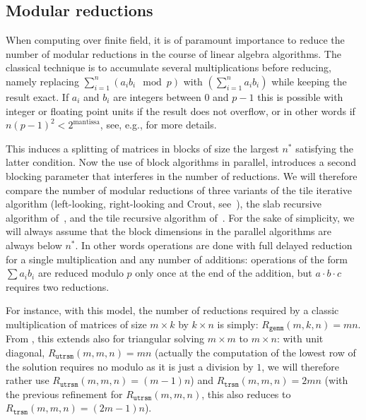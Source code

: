 \documentclass{article}
\newcommand{\gemm}{\texttt{gemm}\xspace}
\newcommand{\trsm}{\texttt{trsm}\xspace}
\newcommand{\utrsm}{\texttt{utrsm}\xspace}
\begin{document}
 
 
 
 
 
 
 

 

 
 
 
 
 

 

 
 
 

 
 

\subsection{Modular reductions}
\label{sec:modcount}
When computing over finite field, it is of paramount importance to
reduce the number of modular reductions in the course of linear algebra
algorithms. The classical technique is to accumulate several
multiplications before reducing, namely replacing 
$\sum_{i=1}^n (a_ib_i \mod p)$ with $\left(\sum_{i=1}^n a_ib_i\right)$ while keeping
the result exact. If $a_i$ and $b_i$ are integers between $0$ and
$p-1$ this is possible with integer or floating point units if the
result does not overflow, or in other words if
$n(p-1)^2<2^\text{mantissa}$, see, e.g., \cite{DGP08} for more
details. 

This induces a splitting of matrices in blocks of size the largest $n^*$ satisfying
the latter condition. Now the use of block algorithms in parallel, introduces a
second blocking parameter that interferes in the number of reductions.
We will therefore compare the number of modular reductions of three variants of
the tile iterative algorithm (left-looking, right-looking and Crout, see~\cite{DDSV98}), the slab
recursive algorithm of~\cite{DGP08}, and the tile recursive algorithm of~\cite{DPS13}.
For the sake of simplicity, we will always assume that the block dimensions in the
parallel algorithms are always below $n^*$. In other words operations are done with full
delayed reduction for a single multiplication and any number of
additions: operations of the form $\sum a_i b_i$ are reduced modulo
$p$ only once at the end of the addition, but $a \cdot b \cdot c$ requires two
reductions.
 
 
 
 
 
 
 
 
 
 
 
 
 
For instance, with this model, the number of reductions required by a
classic multiplication of matrices of size $m\times k$ by $k\times n$
is simply: $R_{\gemm}(m,k,n)=mn$.
From \cite[Theorem~3]{DPS13}, this extends also for triangular solving $m\times
m$ to $m\times n$: with
unit diagonal, $R_\utrsm(m,m,n)=mn$ (actually the computation of the lowest row of
the solution requires no modulo as it is just a division by $1$, we will
therefore rather use $R_\utrsm(m,m,n)=(m-1)n$) 
and $R_\trsm(m,m,n)=2mn$ (with the previous refinement for
$R_\utrsm(m,m,n)$, this also reduces to $R_\trsm(m,m,n)=(2m-1)n$).
 
\end{document}
